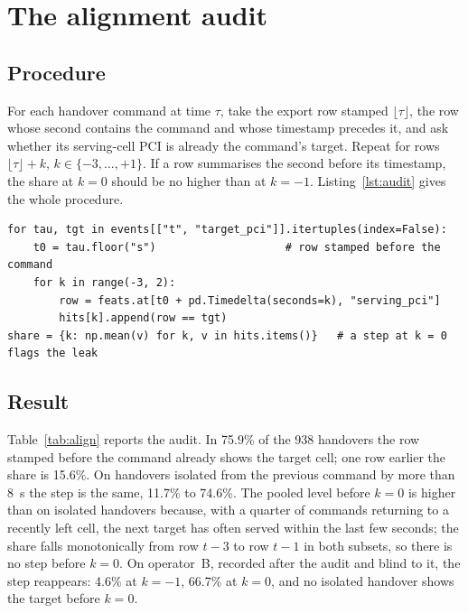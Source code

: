 \documentclass[preprint,review,12pt]{elsarticle}\usepackage{lineno}\linenumbers
\begin{document}
\section{The alignment audit}
\label{sec:audit}

\subsection{Procedure}
For each handover command at time $\tau$, take the export row stamped $\lfloor\tau\rfloor$, the row whose second contains the command and whose timestamp precedes it, and ask whether its serving-cell PCI is already the command's target. Repeat for rows $\lfloor\tau\rfloor + k$, $k\in\{-3,\dots,+1\}$. If a row summarises the second before its timestamp, the share at $k=0$ should be no higher than at $k=-1$. Listing~\ref{lst:audit} gives the whole procedure.

\begin{lstlisting}[caption={The alignment audit (pandas). \texttt{feats}: one row per export second; \texttt{events}: decoded handover commands with target PCI.},label={lst:audit},float=t]
for tau, tgt in events[["t", "target_pci"]].itertuples(index=False):
    t0 = tau.floor("s")                    # row stamped before the command
    for k in range(-3, 2):
        row = feats.at[t0 + pd.Timedelta(seconds=k), "serving_pci"]
        hits[k].append(row == tgt)
share = {k: np.mean(v) for k, v in hits.items()}   # a step at k = 0 flags the leak
\end{lstlisting}

\subsection{Result}
Table~\ref{tab:align} reports the audit. In 75.9\% of the 938 handovers the row stamped before the command already shows the target cell; one row earlier the share is 15.6\%. On handovers isolated from the previous command by more than 8~s the step is the same, 11.7\% to 74.6\%. The pooled level before $k=0$ is higher than on isolated handovers because, with a quarter of commands returning to a recently left cell, the next target has often served within the last few seconds; the share falls monotonically from row $t-3$ to row $t-1$ in both subsets, so there is no step before $k=0$. On operator~B, recorded after the audit and blind to it, the step reappears: 4.6\% at $k=-1$, 66.7\% at $k=0$, and no isolated handover shows the target before $k=0$.
\end{document}
